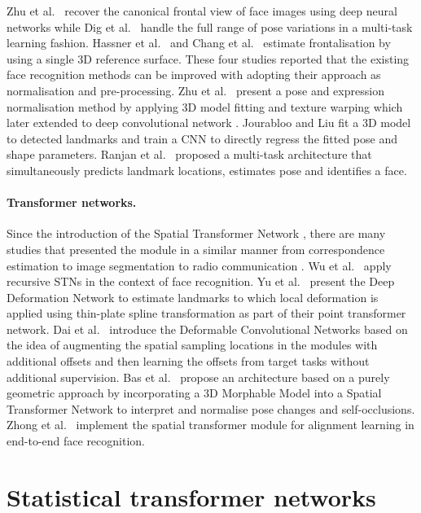 \documentclass[runningheads]{llncs}
\newcommand{\etal}{{et al.~}}
\begin{document}
Zhu \etal \cite{zhu2014recover} recover the canonical frontal view of face images using deep neural networks while Dig \etal\cite{ding2015multi} handle the full range of pose variations in a multi-task learning fashion. Hassner \etal \cite{hassner2015effective} and Chang \etal \cite{chang2017faceposenet} estimate frontalisation by using a single 3D reference surface. These four studies reported that the existing face recognition methods can be improved with adopting their approach as normalisation and pre-processing. Zhu \etal \cite{zhu2015high} present a pose and expression normalisation method by applying 3D model fitting and texture warping which later extended to deep convolutional network \cite{zhu2016face}.
Jourabloo and Liu \cite{jourabloo2016large} fit a 3D model to detected landmarks and train a CNN to directly regress the fitted pose and shape parameters.
Ranjan \etal \cite{ranjan2017hyperface,ranjan2017all} proposed a multi-task architecture that simultaneously predicts landmark locations, estimates pose and identifies a face.


\paragraph{Transformer networks.}

Since the introduction of the Spatial Transformer Network \cite{jaderberg2015spatial}, there are many studies that presented the module in a similar manner from correspondence estimation \cite{choy2016universal} to image segmentation \cite{li2017dense} to radio communication \cite{o2016radio}.
Wu \etal \cite{wu2017recursive} apply recursive STNs in the context of face recognition.
Yu \etal \cite{yu2016deep} present the Deep Deformation Network to estimate landmarks to which local deformation is applied using thin-plate spline transformation as part of their point transformer network.
Dai \etal \cite{dai2017deformable} introduce the Deformable Convolutional Networks based on the idea of augmenting the spatial sampling locations in the modules with additional offsets and then learning the offsets from target tasks without additional supervision.
Bas \etal \cite{bas20173D} propose an architecture based on a purely geometric approach by incorporating a 3D Morphable Model into a Spatial Transformer Network to interpret and normalise pose changes and self-occlusions.
Zhong \etal \cite{zhong2017towards} implement the spatial transformer module for alignment learning in end-to-end face recognition.


\section{Statistical transformer networks}
\end{document}
